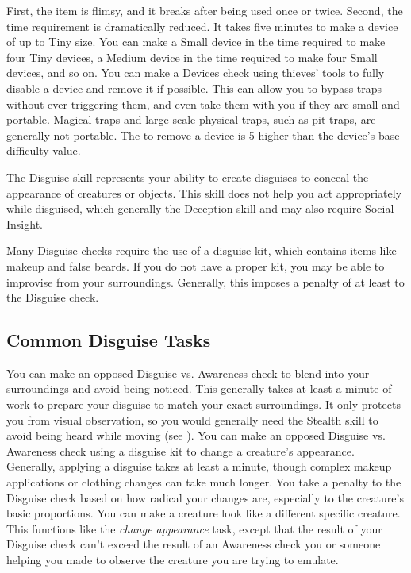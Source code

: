         First, the item is flimsy, and it breaks after being used once or twice.
        Second, the time requirement is dramatically reduced.
        It takes five minutes to make a device of up to Tiny size.
        You can make a Small device in the time required to make four Tiny devices, a Medium device in the time required to make four Small devices, and so on.
         You can make a Devices check using thieves' tools to fully disable a device and remove it if possible.
        This can allow you to bypass traps without ever triggering them, and even take them with you if they are small and portable.
        Magical traps and large-scale physical traps, such as pit traps, are generally not portable.
        The  to remove a device is 5 higher than the device's base difficulty value.

\newpage
{}
    The Disguise skill represents your ability to create disguises to conceal the appearance of creatures or objects.
    This skill does not help you act appropriately while disguised, which generally the Deception skill and may also require Social Insight.

    Many Disguise checks require the use of a disguise kit, which contains items like makeup and false beards.
    If you do not have a proper kit, you may be able to improvise from your surroundings.
    Generally, this imposes a penalty of at least  to the Disguise check.

    \subsection{Common Disguise Tasks}
         You can make an opposed Disguise vs. Awareness check to blend into your surroundings and avoid being noticed.
        This generally takes at least a minute of work to prepare your disguise to match your exact surroundings.
        It only protects you from visual observation, so you would generally need the Stealth skill to avoid being heard while moving (see ).
        \label{Change Appearance} 
        You can make an opposed Disguise vs. Awareness check using a disguise kit to change a creature's appearance.
        Generally, applying a disguise takes at least a minute, though complex makeup applications or clothing changes can take much longer.
        You take a penalty to the Disguise check based on how radical your changes are, especially to the creature's basic proportions.
         You can make a creature look like a different specific creature.
         This functions like the \textit{change appearance} task, except that the result of your Disguise check can't exceed the result of an Awareness check you or someone helping you made to observe the creature you are trying to emulate.

